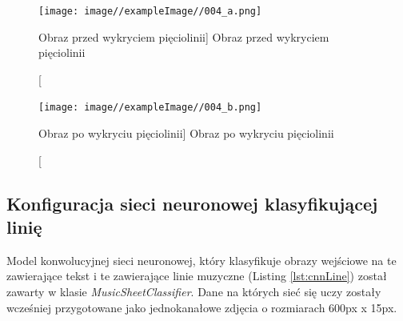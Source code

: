 \documentclass[a4paper,12pt]{article}
\newcommand\spacingIndent{2.2em}
\begin{document}
    		\begin{figure}[!ht]  
			    \begin{center}
				    \texttt{[image: image//exampleImage//004\_a.png]} 
			    \end{center}
			    \caption
    			    [Obraz przed wykryciem pięciolinii]  
    			    {Obraz przed wykryciem pięciolinii}  
		    \end{figure} 
		
		    \begin{figure}[!ht]  
			    \begin{center}
				    \texttt{[image: image//exampleImage//004\_b.png]} 
			    \end{center}
			    \caption
    			    [Obraz po wykryciu pięciolinii]  
    			    {Obraz po wykryciu pięciolinii}  
		    \end{figure} 
		
		\subsection{Konfiguracja sieci neuronowej klasyfikującej linię}  
		\label{subsubsection:cnnLineText}
	        \hspace{\spacingIndent}  
	        Model konwolucyjnej sieci neuronowej, który klasyfikuje obrazy wejściowe na te zawierające tekst i te zawierające linie muzyczne (Listing \ref{lst:cnnLine}) został zawarty w klasie \textit{MusicSheetClassifier}. Dane na których sieć się uczy zostały wcześniej przygotowane jako jednokanałowe zdjęcia o rozmiarach 600px x 15px.
	        
		
                
		    
            
\end{document}
